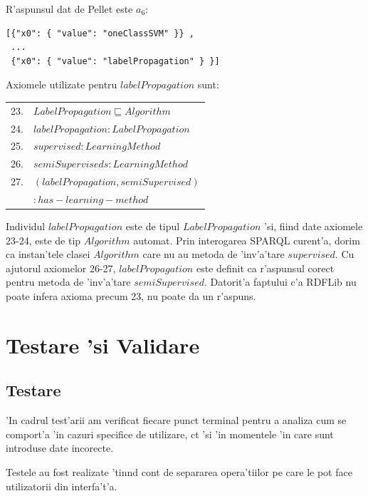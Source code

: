 \documentclass[12pt,a4paper,twoside]{report}
\begin{document}
R'aspunsul dat de Pellet este $a_6$:

\begin{lstlisting}[basicstyle=\footnotesize]
[{"x0": { "value": "oneClassSVM" }} ,
 ...
 {"x0": { "value": "labelPropagation" } }]
\end{lstlisting}

Axiomele utilizate pentru $labelPropagation$ sunt:

\vspace*{0.3cm}
\begin{small}
\begin{tabular}{ll}
23. & $LabelPropagation  \sqsubseteq Algorithm$\\
24. & $labelPropagation:LabelPropagation$\\
25. & $supervised: LearningMethod$\\
26. & $semiSuperviseds: LearningMethod$\\
27. & $(labelPropagation, semiSupervised)$\\
    & $:has-learning-method$\\
\end{tabular}
\end{small}
\vspace*{0.3cm}

Individul $labelPropagation$ este de tipul $LabelPropagation$ 'si, fiind date axiomele 23-24, este de tip $Algorithm$ automat. Prin interogarea SPARQL curent'a, dorim ca instan'tele clasei $Algorithm$ care nu au metoda de 'inv'a'tare $supervised$. Cu ajutorul axiomelor 26-27, $labelPropagation$ este definit ca r'aspunsul corect pentru metoda de 'inv'a'tare $semiSupervised$.
Datorit'a faptului c'a RDFLib nu poate infera axioma precum 23, nu poate da un r'aspuns.

\chapter{Testare 'si Validare}\label{sec:testing}

\section{Testare}
'In cadrul test'arii am verificat fiecare punct terminal pentru a analiza cum se comport'a 'in cazuri specifice de utilizare, c\ia t 'si 'in momentele 'in care sunt introduse date incorecte.

Testele au fost realizate 'tin\ia nd cont de separarea opera'tiilor pe care le pot face utilizatorii din interfa't'a.
\end{document}
